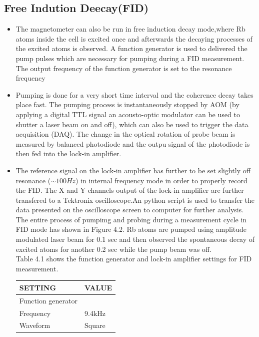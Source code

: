 \subsection{Free Indution Deecay(FID) }
\bigskip
\begin{itemize}
\item The magnetometer can also
be run in free induction decay mode,where Rb atoms inside the cell is excited once and afterwards the decaying processes of the excited atoms is observed. A function generator is used to delivered the pump pulses which are necessary for pumping during a FID measurement. The output frequency of the function generator is set to the resonance frequency
\item Pumping is done for a very short time interval and the coherence decay takes place fast. The pumping process is instantaneously stopped by AOM (by applying a digital TTL signal an acousto-optic modulator can be used to shutter a laser beam on and off), which can also be used to trigger the  data acquisition (DAQ). The change in the optical rotation of probe beam is measured by balanced  photodiode and the outpu signal of the photodiode is then fed into the lock-in amplifier.
\item The reference signal on the lock-in amplifier has further to be set slightly off resonance ($\sim 100 Hz$) in internal frequency mode in order to properly record the FID.
The X and Y channels output of the lock-in amplifier are further transfered to a Tektronix oscilloscope.An python script is used to transfer the data presented on the oscilloscope screen to computer for further analysis. The entire process of pumpimg and probing during a measurement cycle in FID mode  has shown in Figure 4.2. Rb atoms are pumped using amplitude modulated laser beam for 0.1 sec and then observed the spontaneous decay of excited atoms for another 0.2 sec while the pump beam was off. \\
Table 4.1 shows the function generator and lock-in amplifier settings for FID measurement.
\begin{table}[h]
\centering
\begin{tabular}{|l |l|}
\hline

\textbf{ SETTING}    & \textbf{VALUE} \\
\hline
Function generator &   \\
\hline
Frequency & 9.4kHz   \\

Waveform    &  Square  \\


\end{tabular}
\end{table}
\end{itemize}
